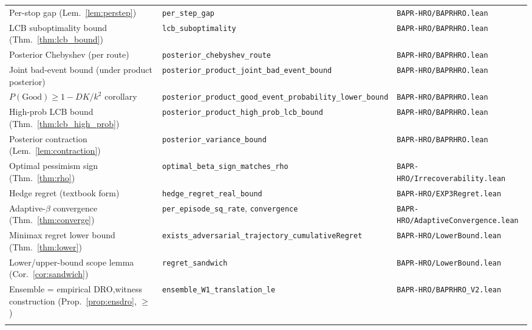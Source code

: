 \documentclass[opre,dblanonrev]{informs4}
\begin{document}
\begin{APPENDICES}
{\begin{longtable}{>{\raggedright\arraybackslash}p{4.0cm}>{\raggedright\arraybackslash}p{6.4cm}>{\raggedright\arraybackslash}p{3.4cm}}
Per-stop gap (Lem.~\ref{lem:perstep}) &
  \texttt{per\_step\_gap} &
  \texttt{BAPR-HRO/\allowbreak BAPRHRO.lean} \\
LCB suboptimality bound (Thm.~\ref{thm:lcb_bound}) &
  \texttt{lcb\_suboptimality} &
  \texttt{BAPR-HRO/\allowbreak BAPRHRO.lean} \\
Posterior Chebyshev (per route) &
  \texttt{posterior\_chebyshev\_route} &
  \texttt{BAPR-HRO/\allowbreak BAPRHRO.lean} \\
Joint bad-event bound (under product posterior) &
  \texttt{posterior\_product\_\allowbreak joint\_bad\_event\_\allowbreak bound} &
  \texttt{BAPR-HRO/\allowbreak BAPRHRO.lean} \\
$P(\mathrm{Good}) \geq 1 - DK/k^2$ corollary &
  \texttt{posterior\_product\_\allowbreak good\_event\_\allowbreak probability\_\allowbreak lower\_\allowbreak bound} &
  \texttt{BAPR-HRO/\allowbreak BAPRHRO.lean} \\
High-prob LCB bound (Thm.~\ref{thm:lcb_high_prob}) &
  \texttt{posterior\_product\_\allowbreak high\_prob\_\allowbreak lcb\_\allowbreak bound} &
  \texttt{BAPR-HRO/\allowbreak BAPRHRO.lean} \\
Posterior contraction (Lem.~\ref{lem:contraction}) &
  \texttt{posterior\_variance\_bound} &
  \texttt{BAPR-HRO/\allowbreak BAPRHRO.lean} \\
Optimal pessimism sign (Thm.~\ref{thm:rho}) &
  \texttt{optimal\_beta\_sign\_\allowbreak matches\_rho} &
  \texttt{BAPR-HRO/\allowbreak Irrecoverability.lean} \\
Hedge regret (textbook form) &
  \texttt{hedge\_regret\_real\_bound} &
  \texttt{BAPR-HRO/\allowbreak EXP3Regret.lean} \\
Adaptive-$\beta$ convergence (Thm.~\ref{thm:converge}) &
  \texttt{per\_episode\_sq\_rate},\newline
  \texttt{convergence} &
  \texttt{BAPR-HRO/\allowbreak Adaptive\allowbreak Convergence.lean} \\
Minimax regret lower bound (Thm.~\ref{thm:lower}) &
  \texttt{exists\_adversarial\_\allowbreak trajectory\_\allowbreak cumulativeRegret} &
  \texttt{BAPR-HRO/\allowbreak LowerBound.lean} \\
Lower/upper-bound scope lemma (Cor.~\ref{cor:sandwich}) &
  \texttt{regret\_sandwich} &
  \texttt{BAPR-HRO/\allowbreak LowerBound.lean} \\
Ensemble = empirical DRO,\newline witness construction (Prop.~\ref{prop:ensdro}, $\geq$) &
  \texttt{ensemble\_W1\_\allowbreak translation\_le} &
  \texttt{BAPR-HRO/\allowbreak BAPRHRO\_V2.lean} \\
\multicolumn{2}{l}{\quad upper bound ($\leq$) reuses Thm.~\ref{thm:dro}} & \\
\bottomrule
\end{longtable}
}


\end{APPENDICES}
\end{document}
